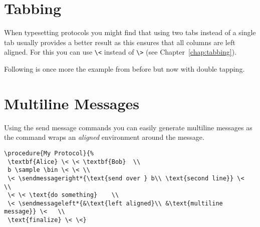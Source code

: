 \documentclass[a4paper]{report}
\begin{document}
\section{Tabbing}
When typesetting protocols you might find that using two tabs instead of a single tab usually provides
a better result as this ensures that all columns are left aligned. 
For this you can use \lstinline$\<$ instead of \lstinline$\>$ (see Chapter~\ref{chap:tabbing}).

Following is once more the example from before but now with double tapping. 
\begin{center}
\end{center}

\section{Multiline Messages}
Using the send message commands you can easily generate multiline messages as the command
wraps an \emph{aligned} environment around the message.
\begin{center}
\end{center}
\begin{lstlisting}
\procedure{My Protocol}{%
 \textbf{Alice} \< \< \textbf{Bob}  \\
 b \sample \bin \< \< \\
 \< \sendmessageright*{\text{send over } b\\ \text{second line}} \<  \\
 \< \< \text{do something}    \\
 \< \sendmessageleft*{&\text{left aligned}\\ &\text{multiline message}} \<   \\
 \text{finalize} \< \<}
\end{lstlisting}
\end{document}

